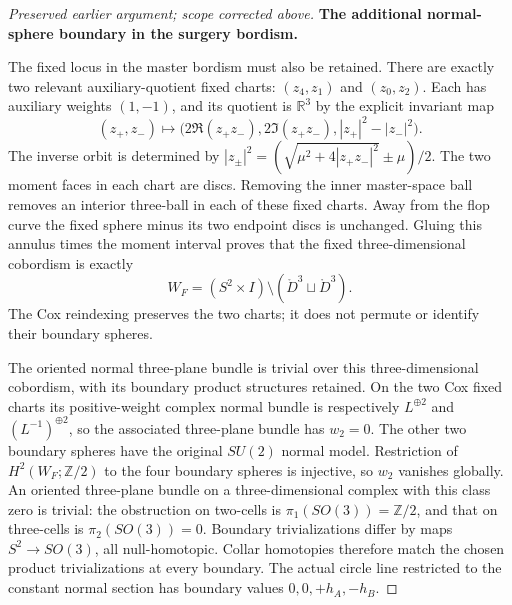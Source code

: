 \begin{proof}[Preserved earlier argument; scope corrected above]
\par\medskip\noindent\textbf{The additional normal-sphere boundary in the surgery bordism.}\enspace

The fixed locus in the master bordism must also be retained.
There are exactly two relevant auxiliary-quotient fixed charts:
\((z_4,z_1)\) and \((z_0,z_2)\).  Each has auxiliary
weights \((1,-1)\), and its quotient is \(\mathbb R^3\)
by the explicit invariant map
\[
      (z_+,z_-)\longmapsto
       \bigl(2\Re(z_+z_-),2\Im(z_+z_-),
                         |z_+|^2-|z_-|^2\bigr).
\]
The inverse orbit is determined by
\(|z_\pm|^2=(\sqrt{\mu^2+4|z_+z_-|^2}\pm\mu)/2\).
The two moment faces in each chart are discs.  Removing the
inner master-space ball removes an interior three-ball in
each of these fixed charts.  Away from the flop curve the
fixed sphere minus its two endpoint discs is unchanged.
Gluing this annulus times the moment interval proves that
the fixed three-dimensional cobordism is exactly
\[
                 W_F=(S^2\times I)\setminus
                             (\mathring D^3\sqcup\mathring D^3).
\]
The Cox reindexing preserves the two charts; it does not
permute or identify their boundary spheres.

The oriented normal three-plane bundle is trivial over this
three-dimensional cobordism, with its boundary product
structures retained.  On the two Cox fixed charts its
positive-weight complex normal bundle is respectively
\(L^{\oplus2}\) and \((L^{-1})^{\oplus2}\), so the
associated three-plane bundle has \(w_2=0\).  The other
two boundary spheres have the original \(SU(2)\) normal
model.  Restriction of \(H^2(W_F;\mathbb Z/2)\) to
the four boundary spheres is injective, so \(w_2\) vanishes
globally.  An oriented three-plane bundle on a three-dimensional
complex with this class zero is trivial: the obstruction on
two-cells is \(\pi_1(SO(3))=\mathbb Z/2\), and that
on three-cells is \(\pi_2(SO(3))=0\).  Boundary
trivializations differ by maps \(S^2\to SO(3)\), all
null-homotopic.  Collar homotopies therefore match the chosen
product trivializations at every boundary.  The actual circle
line restricted to the constant normal section has boundary
values \(0,0,+h_A,-h_B\).


\end{proof}
